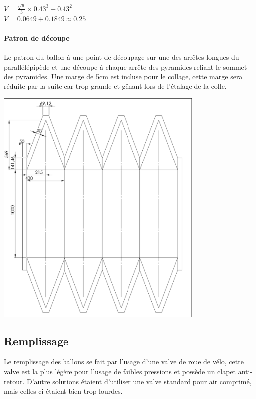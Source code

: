 \documentclass[a4paper,11pt]{article}
\begin{document}
\begin{center}
  $\displaystyle{V = \frac{\sqrt{6}}{3} \times 0.43^3 + 0.43^2 }$ \\
	$\displaystyle{V = 0.0649 + 0.1849 \approx 0.25}$
\end{center}

\paragraph{Patron de découpe}

Le patron du ballon à une point de découpage sur une des arrêtes longues du parallélépipède et une découpe à chaque arrête des pyramides reliant le sommet des pyramides. Une marge de 5cm est incluse pour le collage, cette marge sera réduite par la suite car trop grande et gênant lors de l'étalage de la colle.

\begin{center}
 \includegraphics[width=10cm]{../Images/plan_ballon.png}
\end{center}


\subsection{Remplissage}

Le remplissage des ballons se fait par l'usage d'une valve de roue de vélo, cette valve est la plus légère pour l'usage de faibles pressions et possède un clapet anti-retour. D'autre solutions étaient d'utiliser une valve standard pour air comprimé, mais celles ci étaient bien trop lourdes.
\end{document}
